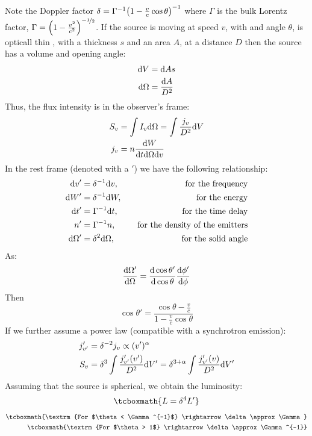 \documentclass[10pt,a4paper,english]{article}
\let\originalleft\left
\let\originalright\right
\renewcommand{\left}{\mathopen{}\mathclose\bgroup\originalleft}
\renewcommand{\right}{\aftergroup\egroup\originalright}
\begin{document}
Note the Doppler factor
$\delta = \Gamma^{-1} \left( 1 - \frac{v}{c }\cos{\theta} \right)^{-1}$
where $\Gamma$ is the bulk Lorentz factor,
$\Gamma = \left( 1 - \frac{v^2}{c^2} \right)^{-\nicefrac{1}{2}}$. If
the source is moving at speed $v$, with and angle $\theta$, is
opticall thin , with a thickness $s$ and an area $A$, at a distance
$D$ then the source has a volume and opening angle:
\begin{align}
  \mathrm{d} V &= \mathrm{d} As \\
  \mathrm{d}\Omega &= \frac{\mathrm{d} A}{D^2}
\end{align}
Thus, the flux intensity is in the observer's frame:
\begin{align}
  S_v &= \int I_v\mathrm{d} \Omega = \int \frac{j_v}{D^2} \mathrm{d} V\\
  j_v &= n \frac{\mathrm{d} W}{\mathrm{d} t\mathrm{d} \Omega \mathrm{d} v}
\end{align}
In the rest frame (denoted with a ${}'$) we have the following
relationship:
\begin{align}
  \mathrm{d} v' &= \delta^{-1}\mathrm{d} v, &\quad \textrm{for the frequency} \\
  \mathrm{d} W' &= \delta^{-1}\mathrm{d} W, &\quad \textrm{for the energy} \\
  \mathrm{d} t' &= \Gamma^{-1}\mathrm{d} t, &\quad \textrm{for the time delay} \\
  n'    &= \Gamma^{-1} n,   &\quad \textrm{for the density of the emitters}\\
  \mathrm{d}\Omega' &= \delta^2\mathrm{d}\Omega, &\quad \textrm{for the solid angle}
\end{align}
As:
\begin{equation}
  \frac{\mathrm{d}\Omega'}{\mathrm{d}\Omega} = \frac{\mathrm{d}\cos{\theta'}}{\mathrm{d}\cos{\theta}}\frac{\mathrm{d}\phi'}{\mathrm{d}\phi}
\end{equation}
Then
\begin{equation}
 \cos{\theta'} = \frac{\cos{\theta} - \frac{v}{c}}{1 - \frac{v}{c}\cos{\theta}}
\end{equation}
If we further assume a power law (compatible with a synchrotron emission):
\begin{align}
  j_{v'}' &= \delta^{-2} j_v \propto (v')^\alpha \\
  S_v    &= \delta^3 \int \frac{j_{v'}' (v')}{D^2} \mathrm{d} V' = \delta^{3+\alpha}\int \frac{j_{v'}' (v)}{D^2}\mathrm{d} V'
\end{align}
Assuming that the source is spherical, we obtain the luminosity:
\begin{equation}
  \tcboxmath{
    L = \delta^4 L'
  }
\end{equation}
\begin{align}
  \tcboxmath{\textrm{For $\theta < \Gamma^{-1}$} \rightarrow \delta\approx\Gamma} \\
  \tcboxmath{\textrm{For $\theta > 1$} \rightarrow \delta\approx\Gamma^{-1}}
\end{align}
\end{document}
